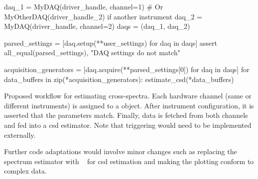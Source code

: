 \begin{listing}[htpb]
    \begin{py}
        daq_1 = MyDAQ(driver_handle, channel=1)
        # Or MyOtherDAQ(driver_handle_2) if another instrument
        daq_2 = MyDAQ(driver_handle, channel=2)
        daqs = (daq_1, daq_2)

        parsed_settings = [daq.setup(**user_settings) for daq in daqs]
        assert all_equal(parsed_settings), "DAQ settings do not match"

        acquisition_generators = [daq.acquire(**parsed_settings[0])
                                  for daq in daqs]
        for data_buffers in zip(*acquisition_generators):
            estimate_csd(*data_buffers)
    \end{py}
    \caption[Proposed  workflow for cross-spectra]{
        Proposed  workflow for estimating cross-spectra.
        Each hardware channel (same or different instruments) is assigned to a  object.
        After instrument configuration, it is asserted that the parameters match.
        Finally, data is fetched from both channels and fed into a \gls{csd} estimator.
        Note that triggering would need to be implemented externally.
    }
    \label{lst:speck:conclusion:cross_workflow}
\end{listing}

Further code adaptations would involve minor changes such as replacing the spectrum estimator with ~ for \gls{csd} estimation
and making the plotting conform to complex data.
